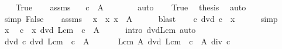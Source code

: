 \begin{isabellebody}
\ \ \isamarkupfalse%
\ True\isanewline
\ \ \isamarkupfalse%
\ assms\ \isamarkupfalse%
\ {\isachardoublequoteopen}{\isacharparenleft}{\kern0pt}{\isacharasterisk}{\kern0pt}{\isacharparenright}{\kern0pt}\ c\ {\isacharbackquote}{\kern0pt}\ A\ {\isacharequal}{\kern0pt}\ {\isacharbraceleft}{\kern0pt}{}{\isacharbraceright}{\kern0pt}{\isachardoublequoteclose}\isanewline
\ \ \ \ \isamarkupfalse%
\ auto\isanewline
\ \ \isamarkupfalse%
\ True\ \isamarkupfalse%
\ {\isacharquery}{\kern0pt}thesis\ \isamarkupfalse%
\ auto\isanewline
{}\isamarkupfalse%
\isanewline
\ \ \isamarkupfalse%
\ {\isacharbrackleft}{\kern0pt}simp{\isacharbrackright}{\kern0pt}{\isacharcolon}{\kern0pt}\ False\isanewline
\ \ \isamarkupfalse%
\ assms\ \isamarkupfalse%
\ x\ \ x{\isacharcolon}{\kern0pt}\ {\isachardoublequoteopen}x\ {\isasymin}\ A{\isachardoublequoteclose}\isanewline
\ \ \ \ \isamarkupfalse%
\ blast\isanewline
\ \ \isamarkupfalse%
\ {\isachardoublequoteopen}c\ dvd\ c\ {\isacharasterisk}{\kern0pt}\ x{\isachardoublequoteclose}\isanewline
\ \ \ \ \isamarkupfalse%
\ simp\isanewline
\ \ \isamarkupfalse%
\ \isamarkupfalse%
\ x\ \isamarkupfalse%
\ {\isachardoublequoteopen}c\ {\isacharasterisk}{\kern0pt}\ x\ dvd\ Lcm\ {\isacharparenleft}{\kern0pt}{\isacharparenleft}{\kern0pt}{\isacharasterisk}{\kern0pt}{\isacharparenright}{\kern0pt}\ c\ {\isacharbackquote}{\kern0pt}\ A{\isacharparenright}{\kern0pt}{\isachardoublequoteclose}\isanewline
\ \ \ \ \isamarkupfalse%
\ {\isacharparenleft}{\kern0pt}intro\ dvd{\isacharunderscore}{\kern0pt}Lcm{\isacharparenright}{\kern0pt}\ auto\isanewline
\ \ \isamarkupfalse%
\ \isamarkupfalse%
\ dvd{\isacharcolon}{\kern0pt}\ {\isachardoublequoteopen}c\ dvd\ Lcm\ {\isacharparenleft}{\kern0pt}{\isacharparenleft}{\kern0pt}{\isacharasterisk}{\kern0pt}{\isacharparenright}{\kern0pt}\ c\ {\isacharbackquote}{\kern0pt}\ A{\isacharparenright}{\kern0pt}{\isachardoublequoteclose}\ \isacommand{{\isachardot}{\kern0pt}}\isamarkupfalse%
\isanewline
\ \ \isamarkupfalse%
\ \isamarkupfalse%
\ {\isachardoublequoteopen}Lcm\ A\ dvd\ Lcm\ {\isacharparenleft}{\kern0pt}{\isacharparenleft}{\kern0pt}{\isacharasterisk}{\kern0pt}{\isacharparenright}{\kern0pt}\ c\ {\isacharbackquote}{\kern0pt}\ A{\isacharparenright}{\kern0pt}\ div\ c{\isachardoublequoteclose}\isanewline

\end{isabellebody}
